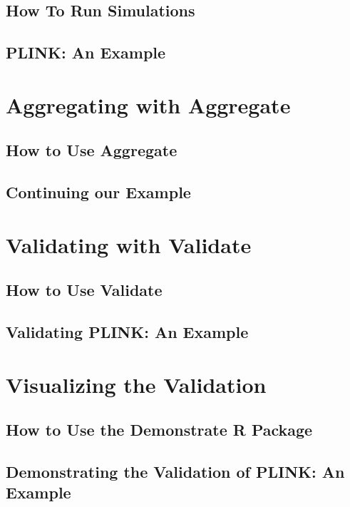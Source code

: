 \documentclass[twoside,a4paper]{refart}
\begin{document}

\subsection{How To Run Simulations}

\subsection{PLINK: An Example}


\section{Aggregating with Aggregate}
\label{layout}

\subsection{How to Use Aggregate}

\subsection{Continuing our Example}

\section{Validating with Validate}

\subsection{How to Use Validate}

\subsection{Validating PLINK: An Example}

\section{Visualizing the Validation}

\subsection{How to Use the Demonstrate R Package}

\subsection{Demonstrating the Validation of PLINK: An Example}
\end{document}
